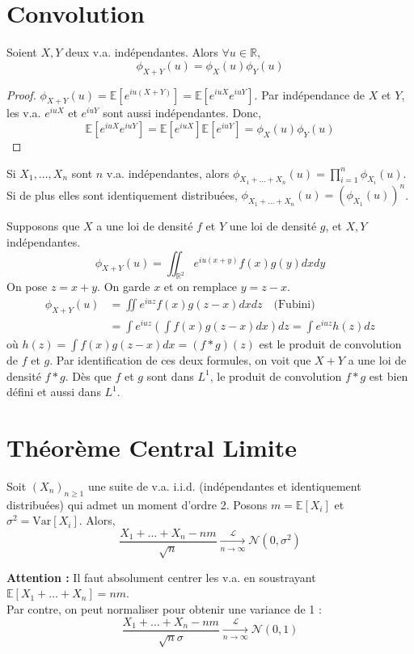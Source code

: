 \section{Convolution}
\begin{lemma}
Soient $X, Y$ deux v.a. indépendantes. Alors $\forall u \in \mathbb{R}$,
\[ \phi_{X+Y}(u) = \phi_X(u) \phi_Y(u) \]
\end{lemma}
\begin{proof}
$\phi_{X+Y}(u) = \mathbb{E}[e^{iu(X+Y)}] = \mathbb{E}[e^{iuX} e^{iuY}]$. Par indépendance de $X$ et $Y$, les v.a. $e^{iuX}$ et $e^{iuY}$ sont aussi indépendantes. Donc,
\[ \mathbb{E}[e^{iuX} e^{iuY}] = \mathbb{E}[e^{iuX}] \mathbb{E}[e^{iuY}] = \phi_X(u) \phi_Y(u) \]
\end{proof}
\begin{corollary}
Si $X_1, \dots, X_n$ sont $n$ v.a. indépendantes, alors $\phi_{X_1+\dots+X_n}(u) = \prod_{i=1}^n \phi_{X_i}(u)$.
Si de plus elles sont identiquement distribuées, $\phi_{X_1+\dots+X_n}(u) = (\phi_{X_1}(u))^n$.
\end{corollary}
Supposons que $X$ a une loi de densité $f$ et $Y$ une loi de densité $g$, et $X,Y$ indépendantes.
\[ \phi_{X+Y}(u) = \iint_{\mathbb{R}^2} e^{iu(x+y)} f(x)g(y) dx dy \]
On pose $z=x+y$. On garde $x$ et on remplace $y=z-x$.
\begin{align*}
    \phi_{X+Y}(u) &= \iint e^{iuz} f(x)g(z-x) dx dz \quad \text{(Fubini)} \\
    &= \int e^{iuz} \left( \int f(x)g(z-x) dx \right) dz = \int e^{iuz} h(z) dz
\end{align*}
où $h(z) = \int f(x)g(z-x) dx = (f*g)(z)$ est le produit de convolution de $f$ et $g$.
Par identification de ces deux formules, on voit que $X+Y$ a une loi de densité $f*g$.
Dès que $f$ et $g$ sont dans $L^1$, le produit de convolution $f*g$ est bien défini et aussi dans $L^1$.
\section{Théorème Central Limite}
\begin{theorem}
Soit $(X_n)_{n \geq 1}$ une suite de v.a. i.i.d. (indépendantes et identiquement distribuées) qui admet un moment d'ordre 2. Posons $m = \mathbb{E}[X_i]$ et $\sigma^2 = \text{Var}[X_i]$. Alors,
\[ \frac{X_1 + \dots + X_n - nm}{\sqrt{n}} \xrightarrow[n \to \infty]{\mathcal{L}} \mathcal{N}(0, \sigma^2) \]
\end{theorem}
\textbf{Attention :} Il faut absolument centrer les v.a. en soustrayant $\mathbb{E}[X_1+\dots+X_n] = nm$. \\
Par contre, on peut normaliser pour obtenir une variance de 1 :
\[ \frac{X_1 + \dots + X_n - nm}{\sqrt{n}\sigma} \xrightarrow[n \to \infty]{\mathcal{L}} \mathcal{N}(0, 1) \]
